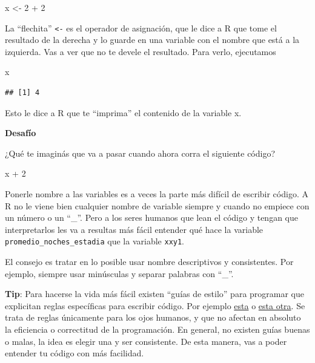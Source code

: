 \documentclass[
  openany]{book}
\newenvironment{Shaded}{\begin{snugshade}}{\end{snugshade}}
\newcommand{\DecValTok}[1]{\textcolor[rgb]{0.00,0.00,0.81}{#1}}
\newcommand{\NormalTok}[1]{#1}
\newcommand{\OtherTok}[1]{\textcolor[rgb]{0.56,0.35,0.01}{#1}}
\newcommand{\SpecialCharTok}[1]{\textcolor[rgb]{0.00,0.00,0.00}{#1}}
\begin{document}
\begin{Shaded}
\begin{Highlighting}[]
\NormalTok{x }\OtherTok{\textless{}{-}} \DecValTok{2} \SpecialCharTok{+} \DecValTok{2}
\end{Highlighting}
\end{Shaded}

La ``flechita'' \texttt{\textless{}-} es el operador de asignación, que le dice a R que tome el resultado de la derecha y lo guarde en una variable con el nombre que está a la izquierda.
Vas a ver que no te devele el resultado.
Para verlo, ejecutamos

\begin{Shaded}
\begin{Highlighting}[]
\NormalTok{x}
\end{Highlighting}
\end{Shaded}

\begin{verbatim}
## [1] 4
\end{verbatim}

Esto le dice a R que te ``imprima'' el contenido de la variable x.

\textbf{Desafío}

¿Qué te imaginás que va a pasar cuando ahora corra el siguiente código?

\begin{Shaded}
\begin{Highlighting}[]
\NormalTok{x }\SpecialCharTok{+} \DecValTok{2}
\end{Highlighting}
\end{Shaded}

Ponerle nombre a las variables es a veces la parte más difícil de escribir código.
A R no le viene bien cualquier nombre de variable siempre y cuando no empiece con un número o un ``\_''.
Pero a los seres humanos que lean el código y tengan que interpretarlos les va a resultas más fácil entender qué hace la variable \texttt{promedio\_noches\_estadia} que la variable \texttt{xxy1}.

El consejo es tratar en lo posible usar nombre descriptivos y consistentes.
Por ejemplo, siempre usar minúsculas y separar palabras con ``\_''.

\textbf{Tip}: Para hacerse la vida más fácil existen ``guías de estilo'' para programar que explicitan reglas específicas para escribir código.
Por ejemplo \href{https://rpubs.com/FvD/guia-estilo-r}{esta} o \href{https://github.com/eliocamp/tesis/blob/master/docs/gu\%C3\%ADa_de_estilo.md}{esta otra}.
Se trata de reglas únicamente para los ojos humanos, y que no afectan en absoluto la eficiencia o correctitud de la programación.
En general, no existen guías buenas o malas, la idea es elegir una y ser consistente.
De esta manera, vas a poder entender tu código con más facilidad.
\end{document}
